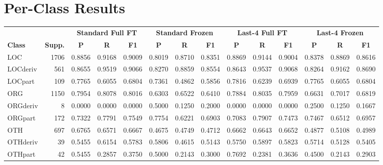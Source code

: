 \documentclass[11pt,a4paper,twocolumn]{article}
\begin{document}
\FloatBarrier

\section{Per-Class Results}
\label{app:per-class-results}

\begin{table}[t]
\centering
\scriptsize
\setlength{\tabcolsep}{3.5pt}
\begin{tabular}{l r ccc ccc ccc ccc}
\toprule
& & \multicolumn{3}{c}{\textbf{Standard Full FT}} 
& \multicolumn{3}{c}{\textbf{Standard Frozen}} 
& \multicolumn{3}{c}{\textbf{Last-4 Full FT}} 
& \multicolumn{3}{c}{\textbf{Last-4 Frozen}} \\
\cmidrule(lr){3-5}\cmidrule(lr){6-8}\cmidrule(lr){9-11}\cmidrule(lr){12-14}
\textbf{Class} & \textbf{Supp.} 
& \textbf{P} & \textbf{R} & \textbf{F1}
& \textbf{P} & \textbf{R} & \textbf{F1}
& \textbf{P} & \textbf{R} & \textbf{F1}
& \textbf{P} & \textbf{R} & \textbf{F1} \\
\midrule
LOC      & 1706 & 0.8856 & 0.9168 & 0.9009 & 0.8019 & 0.8710 & 0.8351 & 0.8869 & 0.9144 & 0.9004 & 0.8378 & 0.8869 & 0.8616 \\
LOCderiv &  561 & 0.8655 & 0.9519 & 0.9066 & 0.8270 & 0.8859 & 0.8554 & 0.8643 & 0.9537 & 0.9068 & 0.8264 & 0.9162 & 0.8690 \\
LOCpart  &  109 & 0.7765 & 0.6055 & 0.6804 & 0.7361 & 0.4862 & 0.5856 & 0.7816 & 0.6239 & 0.6939 & 0.7765 & 0.6055 & 0.6804 \\
ORG      & 1150 & 0.7954 & 0.8078 & 0.8016 & 0.6303 & 0.6522 & 0.6410 & 0.7884 & 0.8035 & 0.7959 & 0.6631 & 0.7017 & 0.6819 \\
ORGderiv &    8 & 0.0000 & 0.0000 & 0.0000 & 0.5000 & 0.1250 & 0.2000 & 0.0000 & 0.0000 & 0.0000 & 0.2500 & 0.1250 & 0.1667 \\
ORGpart  &  172 & 0.7322 & 0.7791 & 0.7549 & 0.7754 & 0.6221 & 0.6903 & 0.7083 & 0.7907 & 0.7473 & 0.7467 & 0.6512 & 0.6957 \\
OTH      &  697 & 0.6765 & 0.6571 & 0.6667 & 0.4675 & 0.4749 & 0.4712 & 0.6662 & 0.6643 & 0.6652 & 0.4877 & 0.5108 & 0.4989 \\
OTHderiv &   39 & 0.5455 & 0.6154 & 0.5783 & 0.5806 & 0.4615 & 0.5143 & 0.5750 & 0.5897 & 0.5823 & 0.5714 & 0.5128 & 0.5405 \\
OTHpart  &   42 & 0.5455 & 0.2857 & 0.3750 & 0.5000 & 0.2143 & 0.3000 & 0.7692 & 0.2381 & 0.3636 & 0.4500 & 0.2143 & 0.2903 \\

\end{tabular}
\end{table}
\end{document}
